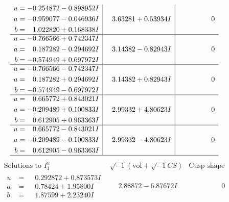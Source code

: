 \documentclass[1p]{elsarticle_modified}
\theoremstyle{definition}
\newcommand{\I}{\sqrt{-1}}
\begin{document}
$$\begin{array}{c|c|c}
\begin{aligned}
u &= -0.254872 - 0.898952 I \\
a &= -0.959077 - 0.046936 I \\
b &= \phantom{-}1.022820 + 0.168338 I\end{aligned}
 & \phantom{-}3.63281 + 0.53934 I & \phantom{-0.000000 } 0 \\ \hline\begin{aligned}
u &= -0.766566 + 0.742347 I \\
a &= \phantom{-}0.187282 - 0.294692 I \\
b &= -0.574949 + 0.697972 I\end{aligned}
 & \phantom{-}3.14382 - 0.82943 I & \phantom{-0.000000 } 0 \\ \hline\begin{aligned}
u &= -0.766566 - 0.742347 I \\
a &= \phantom{-}0.187282 + 0.294692 I \\
b &= -0.574949 - 0.697972 I\end{aligned}
 & \phantom{-}3.14382 + 0.82943 I & \phantom{-0.000000 } 0 \\ \hline\begin{aligned}
u &= \phantom{-}0.665772 + 0.843021 I \\
a &= -0.209489 + 0.100833 I \\
b &= \phantom{-}0.612905 + 0.963363 I\end{aligned}
 & \phantom{-}2.99332 + 4.80623 I & \phantom{-0.000000 } 0 \\ \hline\begin{aligned}
u &= \phantom{-}0.665772 - 0.843021 I \\
a &= -0.209489 - 0.100833 I \\
b &= \phantom{-}0.612905 - 0.963363 I\end{aligned}
 & \phantom{-}2.99332 - 4.80623 I & \phantom{-0.000000 } 0\\
 \hline 
 \end{array}$$\newpage$$\begin{array}{c|c|c}  
\text{Solutions to }I^u_{1}& \I (\text{vol} + \sqrt{-1}CS) & \text{Cusp shape}\\
 \hline 
\begin{aligned}
u &= \phantom{-}0.292872 + 0.873573 I \\
a &= \phantom{-}0.78424 + 1.95800 I \\
b &= \phantom{-}1.87599 + 2.23240 I\end{aligned}
 & \phantom{-}2.88872 - 6.87672 I & \phantom{-0.000000 } 0 \\ \hline\begin{aligned}

\end{aligned}
\end{array}$$
\end{document}
